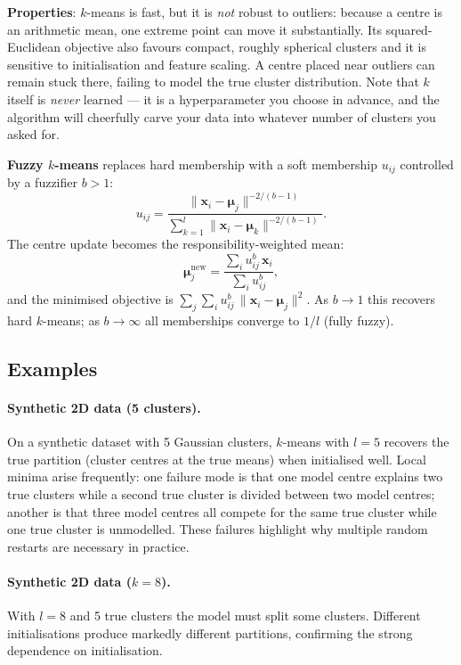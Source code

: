 \documentclass[11pt, oneside]{book}
\begin{document}
\textbf{Properties}: $k$-means is fast, but it is \emph{not} robust to outliers:
because a centre is an arithmetic mean, one extreme point can move it substantially.
Its squared-Euclidean objective also favours compact, roughly spherical clusters and it
is sensitive to initialisation and feature scaling.
A centre placed near outliers can remain stuck there,
failing to model the true cluster distribution.
Note that $k$ itself is \emph{never} learned --- it is a hyperparameter you choose
in advance, and the algorithm will cheerfully carve your data into whatever number
of clusters you asked for.

\textbf{Fuzzy $k$-means} replaces hard membership with a soft membership
$u_{ij}$ controlled by a fuzzifier $b > 1$:
\[
  u_{ij}
  = \frac{\|\bm{x}_i-\bm{\mu}_j\|^{-2/(b-1)}}
         {\sum_{k=1}^l \|\bm{x}_i-\bm{\mu}_k\|^{-2/(b-1)}}.
\]
The centre update becomes the responsibility-weighted mean:
\[
  \bm{\mu}_j^{\text{new}}
  = \frac{\sum_i u_{ij}^{b}\,\bm{x}_i}
         {\sum_i u_{ij}^{b}},
\]
and the minimised objective is
$\sum_j\sum_i u_{ij}^{b}\,\|\bm{x}_i-\bm{\mu}_j\|^2$.
As $b\to 1$ this recovers hard $k$-means; as $b\to\infty$ all memberships
converge to $1/l$ (fully fuzzy).

\subsection{Examples}

\paragraph{Synthetic 2D data (5 clusters).}
On a synthetic dataset with 5 Gaussian clusters, $k$-means with $l=5$
recovers the true partition (cluster centres at the true means) when
initialised well.
Local minima arise frequently:
one failure mode is that one model centre explains two true clusters while
a second true cluster is divided between two model centres;
another is that three model centres all compete for the same true cluster
while one true cluster is unmodelled.
These failures highlight why multiple random restarts are necessary in practice.

\paragraph{Synthetic 2D data ($k=8$).}
With $l=8$ and 5 true clusters the model must split some clusters.
Different initialisations produce markedly different partitions,
confirming the strong dependence on initialisation.
\end{document}
